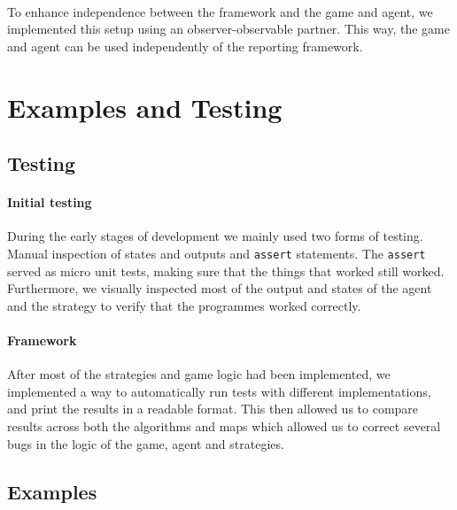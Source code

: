 \documentclass[british]{article}
\newcommand{\code}[1]{\texttt{#1}}
\begin{document}
\paragraph{} To enhance independence between the framework and the game and agent, we implemented this setup using an observer-observable partner. This way, the game and agent can be used independently of the reporting framework. 



\section{Examples and Testing}
\label{sec:testing}
 
\subsection{Testing}
\label{subsec:testing}
\paragraph{Initial testing} During the early stages of development we mainly used two forms of testing. Manual inspection of states and outputs and \code{assert} statements. The \code{assert} served as micro unit tests, making sure that the things that worked still worked. Furthermore, we visually inspected most of the output and states of the agent and the strategy to verify that the programmes worked correctly. 

\paragraph{Framework} After most of the strategies and game logic had been implemented, we implemented a way to automatically run tests with different implementations, and print the results in a readable format. This then allowed us to compare results across both the algorithms and maps which allowed us to correct several bugs in the logic of the game, agent and strategies. 

\subsection{Examples}
\label{example}
\end{document}
